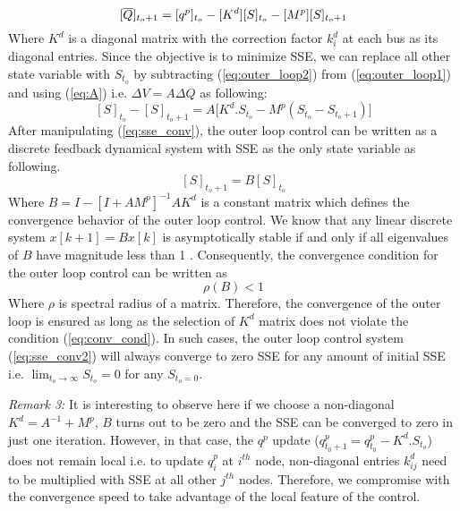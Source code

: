 \documentclass[journal]{IEEEtran}
\begin{document}
\begin{equation}
\small
\label{eq:outer_loop2}
{[\overline{Q}]_{t_o+1}}=[q^p]_{t_o}-[K^d][S]_{t_o}-[M^p] [S]_{t_o+1}
\end{equation}
Where $K^d$ is a diagonal matrix with the correction factor $k_i^d$ at each bus as its diagonal entries. Since the objective is to minimize SSE, we can replace all other state variable with $S_{t_o}$ by subtracting (\ref{eq:outer_loop2}) from (\ref{eq:outer_loop1}) and using (\ref{eq:A}) i.e. $\Delta V = A \Delta Q$ as following:
\begin{equation}
\label{eq:sse_conv}
[S]_{t_o}-[S]_{t_o+1}= A\Big[K^d.S_{t_o}-M^p(S_{t_o}-S_{t_o+1})\Big]
\end{equation}
After manipulating (\ref{eq:sse_conv}), the outer loop control can be written as a discrete feedback dynamical system with SSE as the only state variable as following.
\begin{equation}
\label{eq:sse_conv2}
[S]_{t_o+1}= B[S]_{t_o}
\end{equation}
Where $B=I-[I+AM^p]^{-1}AK^d$ is a constant matrix which defines the convergence behavior of the outer loop control. We know that any linear discrete system $x[k+1]=Bx[k]$ is asymptotically stable if and only if all eigenvalues of $B$ have magnitude less than 1 \cite{chen_linear_2013}. Consequently, the convergence condition for the outer loop control can be written as 
\begin{equation}
\label{eq:conv_cond}
\rho(B)<1
\end{equation}
Where $\rho$ is spectral radius of a matrix. Therefore, the convergence of the outer loop is ensured as long as the selection of $K^d$ matrix does not violate the condition (\ref{eq:conv_cond}). In such cases, the outer loop control system (\ref{eq:sse_conv2}) will always converge to zero SSE for any amount of initial SSE i.e. $\lim_{t_o\to\infty} S_{t_o}=0$ for any $S_{t_o=0}$.

\textit{Remark 3:}  {It is interesting to observe here if we choose a non-diagonal $K^d=A^{-1}+M^p$, $B$ turns out to be zero and the SSE can be converged to zero in just one iteration. However, in that case, the $q^p$ update ($q^p_{t_0+1}=q^p_{t_0}-K^d.S_{t_o}$) does not remain local i.e. to update $q^p_i$ at $i^{th}$ node, non-diagonal entries $k^d_{ij}$ need to be multiplied with SSE at all other $j^{th}$ nodes. Therefore, we compromise with the convergence speed to take advantage of the local feature of the control.}
\end{document}
